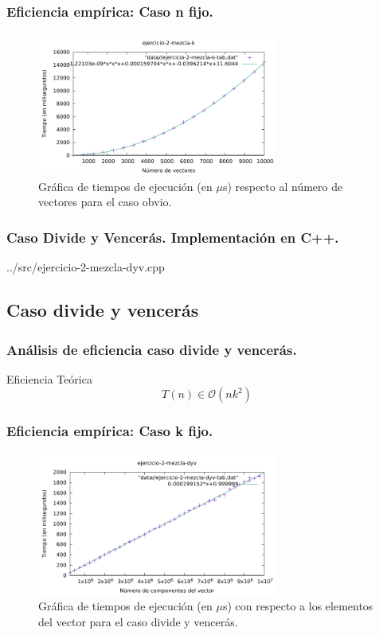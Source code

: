 \documentclass[13pt]{beamer}
\begin{document}
    \begin{frame}
        \frametitle{Eficiencia empírica: Caso n fijo.}

        \begin{figure}
            \includegraphics[width=0.7\textwidth]{../data/2-obvio/ejercicio-2-mezcla-k-graph.pdf}
            \caption{Gráfica de tiempos de ejecución (en $\mu$s) respecto al número de vectores para el caso obvio.}
        \end{figure}
    \end{frame}

    \begin{frame}
		\frametitle{Caso Divide y Vencerás. Implementación en C++.}
		
		{../src/ejercicio-2-mezcla-dyv.cpp} 
	\end{frame}

    \subsection{Caso divide y vencerás}

    \begin{frame}
		\frametitle{Análisis de eficiencia caso divide y vencerás.}
		 \begin{block}{Eficiencia Teórica}
		 	$$T(n) \in \mathcal{O}(nk^{2})$$
		 \end{block}
	 
	\end{frame}


    \begin{frame}
        \frametitle{Eficiencia empírica: Caso k fijo.}

        \begin{figure}
            \includegraphics[width=0.7\textwidth]{../data/2-dyv/ejercicio-2-mezcla-dyv-graph.pdf}
            \caption{Gráfica de tiempos de ejecución (en $\mu$s) con respecto a los elementos del vector para el caso divide y vencerás.}
        \end{figure}
    \end{frame}
\end{document}

